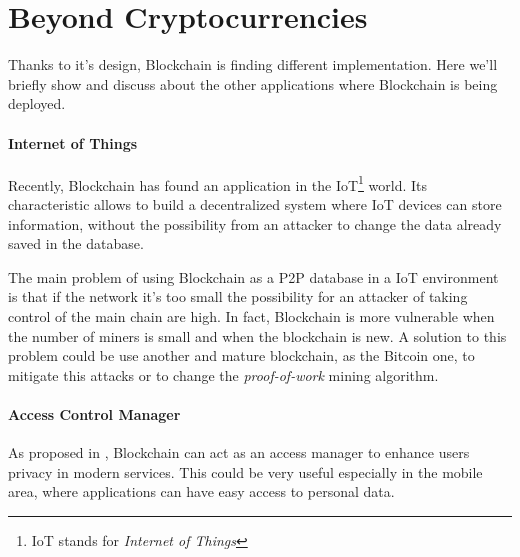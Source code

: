\section{Beyond Cryptocurrencies}

Thanks to it's design, Blockchain is finding different implementation. Here
we'll briefly show and discuss about the other applications where Blockchain is
being deployed.

\paragraph*{Internet of Things}

Recently, Blockchain has found an application in the IoT\footnote{IoT stands
for \textit{Internet of Things}} world\cite{politecnico16}. Its characteristic
allows to build a decentralized system where IoT devices can store information,
without the possibility from an attacker to change the data already saved in
the database\cite{politecnico16}.

The main problem of using Blockchain as a P2P database in a IoT environment is
that if the network it's too small the possibility for an attacker of taking
control of the main chain are high. In fact, Blockchain is more vulnerable when
the number of miners is small and when the blockchain is new. A solution to
this problem could be use another and mature blockchain, as the Bitcoin one, to
mitigate this attacks or to change the \textit{proof-of-work} mining algorithm.

\paragraph*{Access Control Manager}

As proposed in \cite{dp15}, Blockchain can act as an access manager to enhance
users privacy in modern services. This could be very useful especially in the
mobile area, where applications can have easy access to personal data.
